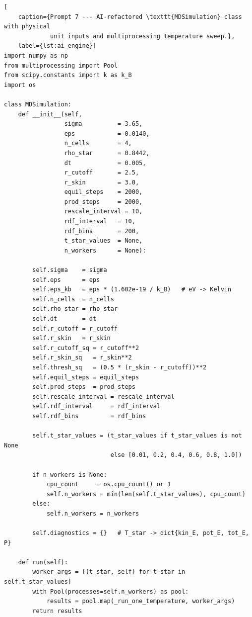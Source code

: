 \begin{lstlisting}[
    caption={Prompt 7 --- AI-refactored \texttt{MDSimulation} class with physical
             unit inputs and multiprocessing temperature sweep.},
    label={lst:ai_engine}]
import numpy as np
from multiprocessing import Pool
from scipy.constants import k as k_B
import os
 
class MDSimulation:
    def __init__(self,
                 sigma          = 3.65,
                 eps            = 0.0140,
                 n_cells        = 4,
                 rho_star       = 0.8442,
                 dt             = 0.005,
                 r_cutoff       = 2.5,
                 r_skin         = 3.0,
                 equil_steps    = 2000,
                 prod_steps     = 2000,
                 rescale_interval = 10,
                 rdf_interval   = 10,
                 rdf_bins       = 200,
                 t_star_values  = None,
                 n_workers      = None):
 
        self.sigma    = sigma
        self.eps      = eps
        self.eps_kb   = eps * (1.602e-19 / k_B)   # eV -> Kelvin
        self.n_cells  = n_cells
        self.rho_star = rho_star
        self.dt       = dt
        self.r_cutoff = r_cutoff
        self.r_skin   = r_skin
        self.r_cutoff_sq = r_cutoff**2
        self.r_skin_sq   = r_skin**2
        self.thresh_sq   = (0.5 * (r_skin - r_cutoff))**2
        self.equil_steps = equil_steps
        self.prod_steps  = prod_steps
        self.rescale_interval = rescale_interval
        self.rdf_interval     = rdf_interval
        self.rdf_bins         = rdf_bins
 
        self.t_star_values = (t_star_values if t_star_values is not None
                              else [0.01, 0.2, 0.4, 0.6, 0.8, 1.0])
 
        if n_workers is None:
            cpu_count     = os.cpu_count() or 1
            self.n_workers = min(len(self.t_star_values), cpu_count)
        else:
            self.n_workers = n_workers
 
        self.diagnostics = {}   # T_star -> dict{kin_E, pot_E, tot_E, P}
 
    def run(self):
        worker_args = [(t_star, self) for t_star in self.t_star_values]
        with Pool(processes=self.n_workers) as pool:
            results = pool.map(_run_one_temperature, worker_args)
        return results
\end{lstlisting}

